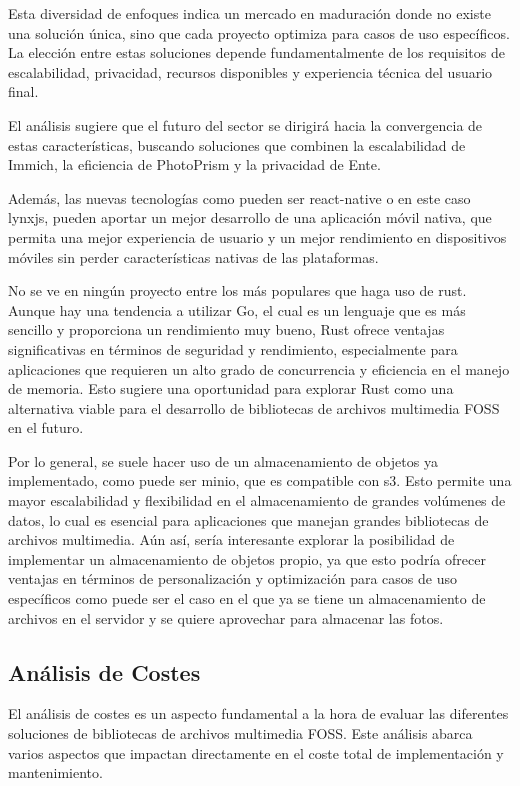 Esta diversidad de enfoques indica un mercado en maduración donde no existe una solución única, sino que cada proyecto optimiza para casos de uso específicos. La elección entre estas soluciones depende fundamentalmente de los requisitos de escalabilidad, privacidad, recursos disponibles y experiencia técnica del usuario final.

El análisis sugiere que el futuro del sector se dirigirá hacia la convergencia de estas características, buscando soluciones que combinen la escalabilidad de Immich, la eficiencia de PhotoPrism y la privacidad de Ente.

Además, las nuevas tecnologías como pueden ser \gls{react-native} o en este caso \gls{lynxjs}, pueden aportar un mejor desarrollo de una aplicación móvil nativa, que permita una mejor experiencia de usuario y un mejor rendimiento en dispositivos móviles sin perder características nativas de las plataformas.

No se ve en ningún proyecto entre los más populares que haga uso de \gls{rust}. Aunque hay una tendencia a utilizar Go, el cual es un lenguaje que es más sencillo y proporciona un rendimiento muy bueno, Rust ofrece ventajas significativas en términos de seguridad y rendimiento, especialmente para aplicaciones que requieren un alto grado de concurrencia y eficiencia en el manejo de memoria. Esto sugiere una oportunidad para explorar Rust como una alternativa viable para el desarrollo de bibliotecas de archivos multimedia FOSS en el futuro.

Por lo general, se suele hacer uso de un almacenamiento de objetos ya implementado, como puede ser \gls{minio}, que es compatible con \gls{s3}. Esto permite una mayor escalabilidad y flexibilidad en el almacenamiento de grandes volúmenes de datos, lo cual es esencial para aplicaciones que manejan grandes bibliotecas de archivos multimedia.
Aún así, sería interesante explorar la posibilidad de implementar un almacenamiento de objetos propio, ya que esto podría ofrecer ventajas en términos de personalización y optimización para casos de uso específicos como puede ser el caso en el que ya se tiene un almacenamiento de archivos en el servidor y se quiere aprovechar para almacenar las fotos.


\subsection{Análisis de Costes}

El análisis de costes es un aspecto fundamental a la hora de evaluar las diferentes soluciones de bibliotecas de archivos multimedia FOSS. Este análisis abarca varios aspectos que impactan directamente en el coste total de implementación y mantenimiento.

